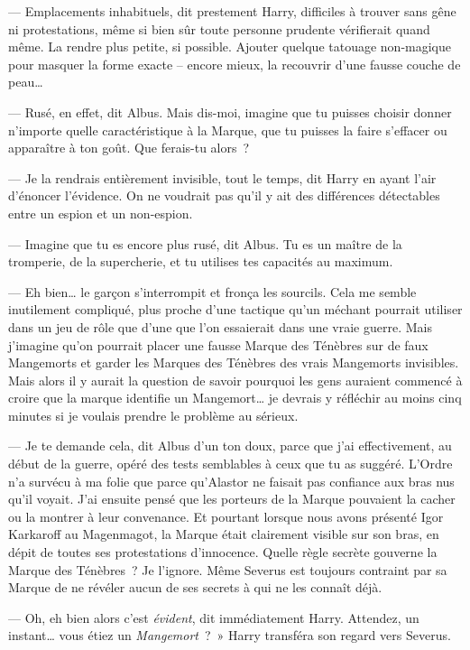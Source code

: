 --- Emplacements inhabituels, dit prestement Harry, difficiles à trouver sans gêne ni protestations, même si bien sûr toute personne prudente vérifierait quand même. La rendre plus petite, si possible. Ajouter quelque tatouage non-magique pour masquer la forme exacte -- encore mieux, la recouvrir d'une fausse couche de peau…

--- Rusé, en effet, dit Albus. Mais dis-moi, imagine que tu puisses choisir donner n'importe quelle caractéristique à la Marque, que tu puisses la faire s'effacer ou apparaître à ton goût. Que ferais-tu alors~?

--- Je la rendrais entièrement invisible, tout le temps, dit Harry en ayant l'air d'énoncer l'évidence. On ne voudrait pas qu'il y ait des différences détectables entre un espion et un non-espion.

--- Imagine que tu es encore plus rusé, dit Albus. Tu es un maître de la tromperie, de la supercherie, et tu utilises tes capacités au maximum.

--- Eh bien… le garçon s'interrompit et fronça les sourcils. Cela me semble inutilement compliqué, plus proche d'une tactique qu'un méchant pourrait utiliser dans un jeu de rôle que d'une que l'on essaierait dans une vraie guerre. Mais j'imagine qu'on pourrait placer une fausse Marque des Ténèbres sur de faux Mangemorts et garder les Marques des Ténèbres des vrais Mangemorts invisibles. Mais alors il y aurait la question de savoir pourquoi les gens auraient commencé à croire que la marque identifie un Mangemort… je devrais y réfléchir au moins cinq minutes si je voulais prendre le problème au sérieux.

--- Je te demande cela, dit Albus d'un ton doux, parce que j'ai effectivement, au début de la guerre, opéré des tests semblables à ceux que tu as suggéré. L'Ordre n'a survécu à ma folie que parce qu'Alastor ne faisait pas confiance aux bras nus qu'il voyait. J'ai ensuite pensé que les porteurs de la Marque pouvaient la cacher ou la montrer à leur convenance. Et pourtant lorsque nous avons présenté Igor Karkaroff au Magenmagot, la Marque était clairement visible sur son bras, en dépit de toutes ses protestations d'innocence. Quelle règle secrète gouverne la Marque des Ténèbres~? Je l'ignore. Même Severus est toujours contraint par sa Marque de ne révéler aucun de ses secrets à qui ne les connaît déjà.

--- Oh, eh bien alors c'est \emph{évident}, dit immédiatement Harry. Attendez, un instant… vous étiez un \emph{Mangemort}~?~» Harry transféra son regard vers Severus.

